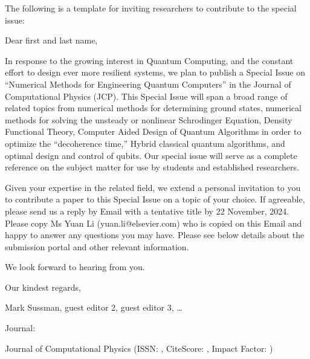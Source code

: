 \documentclass[]{article}
\begin{document}
The following is a template for inviting researchers to contribute to the special issue: \\
\par\noindent
Dear first and last name, \\
\par\noindent

In response to the growing interest in Quantum Computing, and the constant effort to design ever more resilient systems, we plan to publish a Special Issue on ``Numerical Methods for Engineering Quantum Computers'' in the Journal of Computational Physics (JCP). This Special Issue will span a broad range of related topics from numerical methods for determining ground states, numerical methods for solving the unsteady or nonlinear Schrodinger Equation, Density Functional Theory, Computer Aided Design of Quantum Algorithms in order to optimize the ``decoherence time,'' Hybrid classical quantum algorithms, and optimal design and control of qubits. Our special issue will serve as a complete reference on the subject matter for use by students and established researchers. \\

\par\noindent
Given your expertise in the related field, we extend a personal invitation to you to contribute a paper to this Special Issue on a topic of your choice. If agreeable, please send us a reply by Email with a tentative title by 22 November, 2024. Please copy Ms Yuan Li (yuan.li@elsevier.com) who is copied on this Email and happy to answer any questions you may have. Please see below details about the submission portal and other relevant information. \\

\par\noindent
We look forward to hearing from you. \\
\par\noindent

Our kindest regards, \\
\par\noindent

Mark Sussman, guest editor 2, guest editor 3, \ldots \\
\par\noindent

Journal:
\par\noindent

Journal of Computational Physics (ISSN: , CiteScore: , Impact Factor: ) \\
\par\noindent
\end{document}
